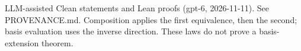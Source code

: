 \documentclass[11pt]{article}
\begin{document}

\bigskip
{\footnotesize LLM-assisted Clean statements and Lean proofs (gpt-6, 2026-11-11).
See PROVENANCE.md. Composition applies the first equivalence, then the second;
basis evaluation uses the inverse direction. These laws do not prove a basis-extension theorem.}
\end{document}
